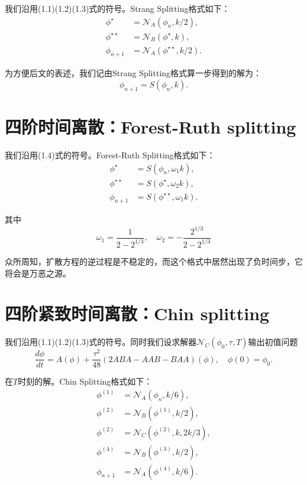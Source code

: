 \documentclass[lang=cn,10pt,bibend=bibtex]{elegantbook}
\begin{document}
我们沿用(1.1)(1.2)(1.3)式的符号。Strang Splitting格式\cite{Strang1968}如下：
\begin{align*}
    \phi^\star &= \mathcal{N}_A(\phi_n,k/2),\\
    \phi^{\star\star} &= \mathcal{N}_B(\phi^\star,k),\\
    \phi_{n+1} &= \mathcal{N}_A(\phi^{\star\star},k/2).
\end{align*}

为方便后文的表述，我们记由Strang Splitting格式算一步得到的解为：
\begin{equation}
    \phi_{n+1} = S(\phi_n,k).
\end{equation}

\section{四阶时间离散：Forest-Ruth splitting}

我们沿用(1.4)式的符号。Forest-Ruth Splitting格式\cite{Forest1990}如下：
\begin{align*}
    \phi^\star &= S(\phi_n,\omega_1k),\\
    \phi^{\star\star} &= S(\phi^\star,\omega_2k),\\
    \phi_{n+1} &= S(\phi^{\star\star},\omega_1k).
\end{align*}

其中
\begin{equation*}
    \omega_1=\frac{1}{2-2^{1/3}},\quad \omega_2=-\frac{2^{1/3}}{2-2^{1/3}}
\end{equation*}

众所周知，扩散方程的逆过程是不稳定的，而这个格式中居然出现了负时间步，它将会是万恶之源。

\section{四阶紧致时间离散：Chin splitting}

我们沿用(1.1)(1.2)(1.3)式的符号。同时我们设求解器$\mathcal{N}_C(\phi_0,\tau,T)$输出初值问题
\begin{equation}
    \frac{d\phi}{dt}=A(\phi)+\frac{\tau^2}{48}(2ABA-AAB-BAA)(\phi),\quad \phi(0)=\phi_0.
\end{equation}

在$T$时刻的解。Chin Splitting格式\cite{Chin1997}如下：
\begin{align*}
    \phi^{(1)} &= \mathcal{N}_A(\phi_n,k/6),\\
    \phi^{(2)} &= \mathcal{N}_B(\phi^{(1)},k/2),\\
    \phi^{(2)} &= \mathcal{N}_C(\phi^{(2)},k,2k/3),\\
    \phi^{(4)} &= \mathcal{N}_B(\phi^{(3)},k/2),\\
    \phi_{n+1} &= \mathcal{N}_A(\phi^{(4)},k/6).
\end{align*}
\end{document}
